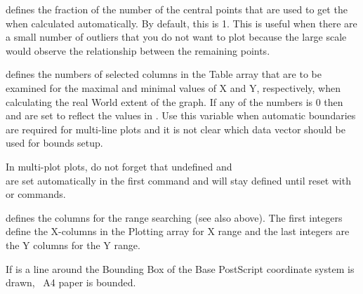 {   
   defines the fraction of the number of the central points that are
   used to get the  when calculated automatically.
   By default, this is 1. This is useful when there are a small number
   of outliers that you do not want to plot because the large scale
   would observe the relationship between the remaining points.

   defines the numbers of selected columns in the Table array that 
   are to be examined for the maximal and minimal values of X and Y, 
   respectively, when calculating the real World extent of the graph. 
   If any of the numbers is 0 then  and 
   are set to reflect the values in .
   Use this variable when automatic boundaries are required
   for multi-line plots and it is not clear which data vector should
   be used for bounds setup.

   In multi-plot plots, do not forget that undefined 
   and \\
    are set automatically in the first  
   command and will stay defined until reset with  or 
   commands.

   defines the columns for the range searching (see also above).
   The first  integers define the X-columns 
   in the Plotting
   array for X range and the last  integers are the 
   Y columns for the Y range.

   If  is  a line around the Bounding Box of the 
   Base PostScript coordinate system is drawn, \ie\ A4 paper is bounded.
}   






